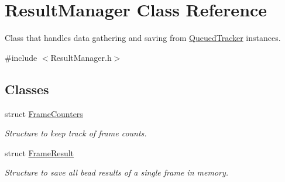 \hypertarget{class_result_manager}{}\section{Result\+Manager Class Reference}
\label{class_result_manager}


Class that handles data gathering and saving from \hyperlink{class_queued_tracker}{Queued\+Tracker} instances.  




{\ttfamily \#include $<$Result\+Manager.\+h$>$}

\subsection*{Classes}
\begin{DoxyCompactItemize}
\item 
struct \hyperlink{struct_result_manager_1_1_frame_counters}{Frame\+Counters}
\begin{DoxyCompactList}\small\item\em Structure to keep track of frame counts. \end{DoxyCompactList}\item 
struct \hyperlink{struct_result_manager_1_1_frame_result}{Frame\+Result}
\begin{DoxyCompactList}\small\item\em Structure to save all bead results of a single frame in memory. \end{DoxyCompactList}\end{DoxyCompactItemize}
